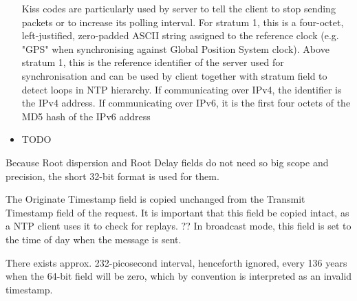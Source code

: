 \begin{itemize}
Kiss codes are particularly used by server to tell the client to stop sending packets or
to increase its polling interval.
For stratum 1, this is a four-octet, left-justified, zero-padded ASCII
string assigned to the reference clock (e.g. "GPS" when synchronising against Global Position System clock).
Above stratum 1, this is the reference identifier of the server used for synchronisation
and can be used by client together with stratum field to detect loops in NTP hierarchy.
If communicating over IPv4, the identifier is the IPv4 address.
If communicating over IPv6, it is the first four octets of the MD5 hash of the IPv6 address~\cite{rfc5905}
\item
TODO
\end{itemize}

Because Root dispersion and Root Delay fields do not need so big scope and precision,
the short 32-bit format is used for them.

The Originate Timestamp field is copied
   unchanged from the Transmit Timestamp field of the request. It is
   important that this field be copied intact, as a NTP client uses it
   to check for replays.
  ?? In broadcast mode, this field is set to the
   time of day when the message is sent.
%

There exists approx. 232-picosecond interval, henceforth ignored, every 136 years when
the 64-bit field will be zero, which by convention is interpreted as an invalid timestamp.
